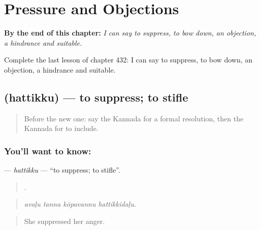 
\chapter{Pressure and Objections}
\label{ch:ka-pressure-and-objections}

\begin{chapteropening}
\textbf{By the end of this chapter:} \emph{I can say to suppress, to bow down, an objection, a hindrance and suitable.}

Complete the last lesson of chapter 432: I can say to suppress, to bow down, an objection, a hindrance and suitable.
\end{chapteropening}

\section[\texorpdfstring{\kn{ಹತ್ತಿಕ್ಕು} (hattikku)}{ಹತ್ತಿಕ್ಕು (hattikku)}]{ (hattikku) — to suppress; to stifle}

\label{lesson:KA-C432-hattikku}



\begin{quote}
Before the new one: say the Kannada for a formal resolution, then the Kannada for to include.
\end{quote}

\subsection*{You'll want to know: }
\textbf{} — \emph{hattikku} — \textquotedblleft{}to suppress; to stifle\textquotedblright{}.

\begin{quote}
   .
\end{quote}

\begin{quote}
\emph{avaḷu tanna kōpavannu hattikkidaḷu.}
\end{quote}

\begin{quote}
She suppressed her anger.
\end{quote}

